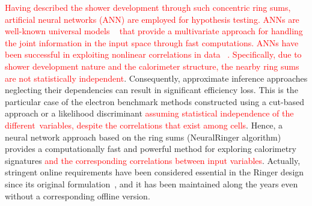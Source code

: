 \textcolor{red}{Having described the shower development through such concentric ring sums,  artificial neural networks (ANN) are employed for hypothesis testing.  ANNs are well-known universal models ~\cite{haykin_2008} that provide a multivariate approach for handling the joint information in the input space through fast computations.  ANNs have been successful in exploiting nonlinear correlations in data \textcolor{red}{~\cite{Duda}}. Specifically, due to shower development nature and the calorimeter structure, the nearby ring sums are not statistically independent}. Consequently, approximate inference approaches neglecting their dependencies can result in significant efficiency loss. This is the particular case of the electron benchmark methods constructed using a cut-based approach or a likelihood discriminant \textcolor{red}{assuming statistical independence of the different variables, despite the correlations that exist among cells}.  Hence, a neural network approach based on the ring sums (NeuralRinger algorithm) provides a computationally fast and powerful method for exploring calorimetry signatures \textcolor{red}{and the corresponding correlations between input variables}. Actually, stringent online requirements have been considered essential in the Ringer design since its original formulation~\cite{1995_seixas_ringer}, and it has been maintained along the years even without a corresponding offline version.





